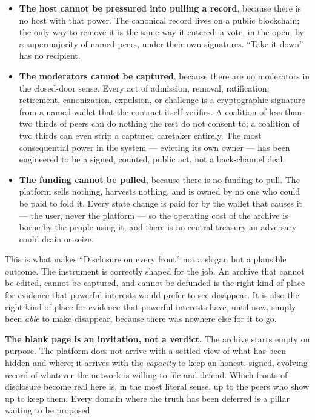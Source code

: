 \documentclass[11pt,a4paper]{article}
\begin{document}
\begin{itemize}[leftmargin=1.4em]
  \item \textbf{The host cannot be pressured into pulling a record},
  because there is no host with that power. The canonical record lives
  on a public blockchain; the only way to remove it is the same way it
  entered: a vote, in the open, by a supermajority of named peers,
  under their own signatures. ``Take it down'' has no recipient.

  \item \textbf{The moderators cannot be captured}, because there are
  no moderators in the closed-door sense. Every act of admission,
  removal, ratification, retirement, canonization, expulsion, or
  challenge is a cryptographic signature from a named wallet that the
  contract itself verifies. A coalition of less than two thirds of
  peers can do nothing the rest do not consent to; a coalition of two
  thirds can even strip a captured caretaker entirely. The most
  consequential power in the system --- evicting its own owner --- has
  been engineered to be a signed, counted, public act, not a
  back-channel deal.

  \item \textbf{The funding cannot be pulled}, because there is no
  funding to pull. The platform sells nothing, harvests nothing, and is
  owned by no one who could be paid to fold it. Every state change is
  paid for by the wallet that causes it --- the user, never the
  platform --- so the operating cost of the archive is borne by the
  people using it, and there is no central treasury an adversary could
  drain or seize.
\end{itemize}

This is what makes ``Disclosure on every front'' not a slogan but a
plausible outcome. The instrument is correctly shaped for the job. An
archive that cannot be edited, cannot be captured, and cannot be
defunded is the right kind of place for evidence that powerful
interests would prefer to see disappear. It is also the right kind of
place for evidence that powerful interests have, until now, simply been
\emph{able} to make disappear, because there was nowhere else for it to
go.

\begin{notebox}
\textbf{The blank page is an invitation, not a verdict.} The archive
starts empty on purpose. The platform does not arrive with a settled
view of what has been hidden and where; it arrives with the
\emph{capacity} to keep an honest, signed, evolving record of whatever
the network is willing to file and defend. Which fronts of disclosure
become real here is, in the most literal sense, up to the peers who
show up to keep them. Every domain where the truth has been deferred is
a pillar waiting to be proposed.
\end{notebox}
\end{document}

